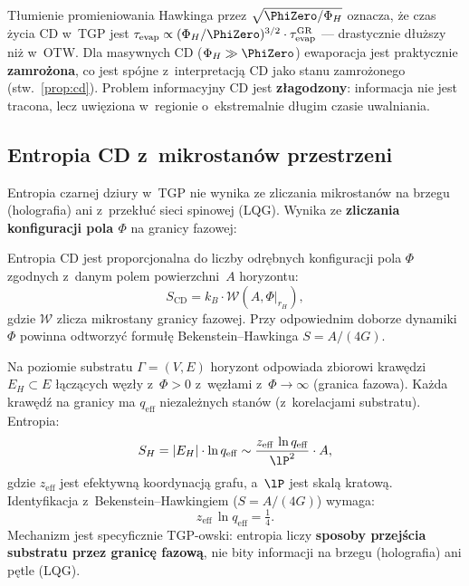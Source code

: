 \begin{remark}
T\l{}umienie promieniowania Hawkinga przez $\sqrt{\PhiZero/\Phi_H}$
oznacza, \.ze czas \.zycia CD w~TGP jest
$\tau_{\mathrm{evap}} \propto (\Phi_H/\PhiZero)^{3/2}
\cdot \tau_{\mathrm{evap}}^{\mathrm{GR}}$
--- drastycznie d\l{}u\.zszy ni\.z w~OTW. Dla masywnych CD
($\Phi_H \gg \PhiZero$) ewaporacja jest praktycznie
\textbf{zamro\.zona}, co jest sp\'ojne z~interpretacj\k{a}
CD jako stanu zamro\.zonego (stw.~\ref{prop:cd}).
Problem informacyjny CD jest \textbf{z\l{}agodzony}: informacja
nie jest tracona, lecz uwi\k{e}ziona w~regionie o~ekstremalnie
d\l{}ugim czasie uwalniania.
\end{remark}

\subsection{Entropia CD z~mikrostanów przestrzeni}\label{ssec:cd-entropia}

Entropia czarnej dziury w~TGP nie wynika ze zliczania
mikrostanów na brzegu (holografia) ani z~przek\l{}u\'c sieci
spinowej (LQG). Wynika ze \textbf{zliczania konfiguracji
pola $\Phi$} na granicy fazowej:

\begin{hypothesis}\label{hyp:entropy}
Entropia CD jest proporcjonalna do liczby odr\k{e}bnych
konfiguracji pola $\Phi$ zgodnych z~danym polem
powierzchni~$A$ horyzontu:
\begin{equation}\label{eq:S-CD}
    S_{\mathrm{CD}} = k_B \cdot \mathcal{W}(A, \Phi|_{r_H}),
\end{equation}
gdzie $\mathcal{W}$ zlicza mikrostany granicy fazowej.
Przy odpowiednim doborze dynamiki $\Phi$ powinna odtworzy\'c
formu\l{}\k{e} Bekenstein--Hawkinga $S = A/(4G)$.
\end{hypothesis}

\begin{proposition}\label{prop:S-BH}
Na poziomie substratu $\Gamma = (V, E)$ horyzont odpowiada
zbiorowi kraw\k{e}dzi $E_H \subset E$ \l{}\k{a}cz\k{a}cych
w\k{e}z\l{}y z~$\Phi > 0$ z~w\k{e}z\l{}ami z~$\Phi \to \infty$
(granica fazowa). Ka\.zda kraw\k{e}d\'z na granicy ma
$q_{\mathrm{eff}}$ niezale\.znych stan\'ow (z~korelacjami
substratu). Entropia:
\begin{equation}\label{eq:S-BH-TGP}
    S_H = |E_H| \cdot \ln q_{\mathrm{eff}}
    \sim \frac{z_{\mathrm{eff}}\,\ln q_{\mathrm{eff}}}{\lP^2}
    \cdot A,
\end{equation}
gdzie $z_{\mathrm{eff}}$ jest efektywn\k{a} koordynacj\k{a}
grafu, a~$\lP$ jest skal\k{a} kratow\k{a}. Identyfikacja
z~Bekenstein--Hawkingiem ($S = A/(4G)$) wymaga:
\begin{equation}
    z_{\mathrm{eff}}\,\ln q_{\mathrm{eff}} = \tfrac{1}{4}.
\end{equation}
Mechanizm jest specyficznie TGP-owski: entropia liczy
\textbf{sposoby przej\'scia substratu przez granic\k{e}
fazow\k{a}}, nie bity informacji na brzegu (holografia)
ani p\k{e}tle (LQG).
\end{proposition}

